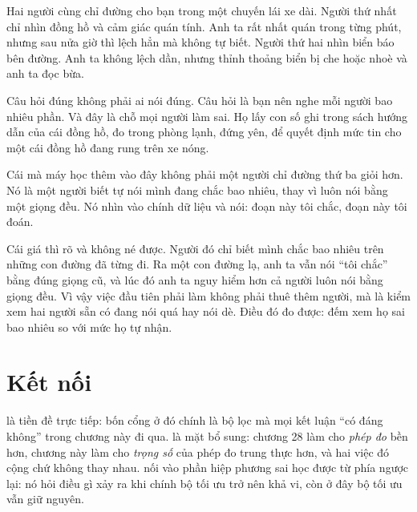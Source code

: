 \documentclass[../../deep_learning.tex]{subfiles}
\begin{document}
\begin{dongian}
Hai người cùng chỉ đường cho bạn trong một chuyến lái xe dài. Người thứ nhất chỉ nhìn đồng hồ và cảm giác quán tính. Anh ta rất nhất quán trong từng phút, nhưng sau nửa giờ thì lệch hẳn mà không tự biết. Người thứ hai nhìn biển báo bên đường. Anh ta không lệch dần, nhưng thỉnh thoảng biển bị che hoặc nhoè và anh ta đọc bừa.

Câu hỏi đúng không phải ai nói đúng. Câu hỏi là bạn nên nghe mỗi người bao nhiêu phần. Và đây là chỗ mọi người làm sai. Họ lấy con số ghi trong sách hướng dẫn của cái đồng hồ, đo trong phòng lạnh, đứng yên, để quyết định mức tin cho một cái đồng hồ đang rung trên xe nóng.

Cái mà máy học thêm vào đây không phải một người chỉ đường thứ ba giỏi hơn. Nó là một người biết tự nói mình đang chắc bao nhiêu, thay vì luôn nói bằng một giọng đều. Nó nhìn vào chính dữ liệu và nói: đoạn này tôi chắc, đoạn này tôi đoán.

Cái giá thì rõ và không né được. Người đó chỉ biết mình chắc bao nhiêu trên những con đường đã từng đi. Ra một con đường lạ, anh ta vẫn nói ``tôi chắc'' bằng đúng giọng cũ, và lúc đó anh ta nguy hiểm hơn cả người luôn nói bằng giọng đều. Vì vậy việc đầu tiên phải làm không phải thuê thêm người, mà là kiểm xem hai người sẵn có đang nói quá hay nói dè. Điều đó đo được: đếm xem họ sai bao nhiêu so với mức họ tự nhận.

\end{dongian}

\section{Kết nối}

 là tiền đề trực tiếp: bốn cổng ở đó chính là bộ lọc mà mọi kết luận ``có đáng không'' trong chương này đi qua.  là mặt bổ sung: chương 28 làm cho \emph{phép đo} bền hơn, chương này làm cho \emph{trọng số} của phép đo trung thực hơn, và hai việc đó cộng chứ không thay nhau.  nối vào phần hiệp phương sai học được từ phía ngược lại: nó hỏi điều gì xảy ra khi chính bộ tối ưu trở nên khả vi, còn ở đây bộ tối ưu vẫn giữ nguyên.
\end{document}
